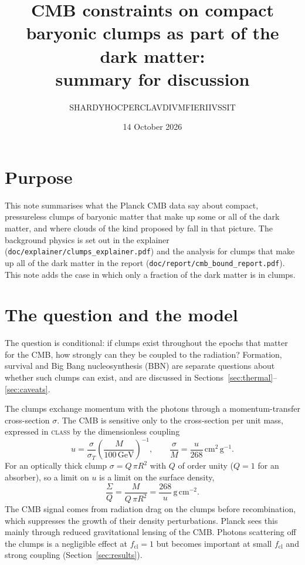 \documentclass[11pt,a4paper]{article}
\title{CMB constraints on compact baryonic clumps as part of the dark matter:\\ summary for discussion}
\author{S\textperiodcentered HARDY\textperiodcentered HOC\textperiodcentered PER\textperiodcentered CLAVDIVM\textperiodcentered FIERI\textperiodcentered IVSSIT}
\date{14 October 2026}
\newcommand{\cl}{\mathrm{cl}}
\begin{document}
\maketitle

\section{Purpose}

This note summarises what the Planck CMB data say about compact, pressureless clumps of baryonic matter that make up some or all of the dark matter, and where clouds of the kind proposed by \citet{WalkerWardle1998} fall in that picture. The background physics is set out in the explainer (\texttt{doc/explainer/clumps\_explainer.pdf}) and the analysis for clumps that make up all of the dark matter in the report (\texttt{doc/report/cmb\_bound\_report.pdf}). This note adds the case in which only a fraction of the dark matter is in clumps.

\section{The question and the model}

The question is conditional: if clumps exist throughout the epochs that matter for the CMB, how strongly can they be coupled to the radiation? Formation, survival and Big Bang nucleosynthesis (BBN) are separate questions about whether such clumps can exist, and are discussed in Sections~\ref{sec:thermal}--\ref{sec:caveats}.

The clumps exchange momentum with the photons through a momentum-transfer cross-section $\sigma$. The CMB is sensitive only to the cross-section per unit mass, expressed in \textsc{class} by the dimensionless coupling
\begin{equation}
u = \frac{\sigma}{\sigma_T}\left(\frac{M}{100\,\mathrm{GeV}}\right)^{-1},
\qquad \frac{\sigma}{M} = \frac{u}{268}\,\mathrm{cm^2\,g^{-1}} .
\end{equation}
For an optically thick clump $\sigma = Q\,\pi R^2$ with $Q$ of order unity ($Q=1$ for an absorber), so a limit on $u$ is a limit on the surface density,
\begin{equation}
\frac{\Sigma}{Q} = \frac{M}{Q\,\pi R^2} = \frac{268}{u}\,\mathrm{g\,cm^{-2}} .
\end{equation}
The CMB signal comes from radiation drag on the clumps before recombination, which suppresses the growth of their density perturbations. Planck sees this mainly through reduced gravitational lensing of the CMB. Photons scattering off the clumps is a negligible effect at $f_\cl = 1$ but becomes important at small $f_\cl$ and strong coupling (Section~\ref{sec:results}).
\end{document}
